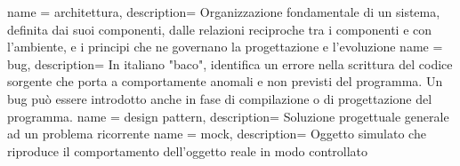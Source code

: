  {
  name = architettura,
  description={
		Organizzazione fondamentale di un sistema, definita dai suoi componenti, dalle relazioni reciproche tra i componenti e con l'ambiente, e i principi che ne governano la progettazione e l'evoluzione}
}
 {
  name = bug,
  description={
		In italiano "baco", identifica un errore nella scrittura del codice sorgente che porta a comportamente anomali e non previsti del programma. Un bug può essere introdotto anche in fase di compilazione o di progettazione del programma.}
}
 {
  name = design pattern,
  description={
		Soluzione progettuale generale ad un problema ricorrente}
}
 {
  name = mock,
  description={
		Oggetto simulato che riproduce il comportamento dell'oggetto reale in modo controllato}
}




